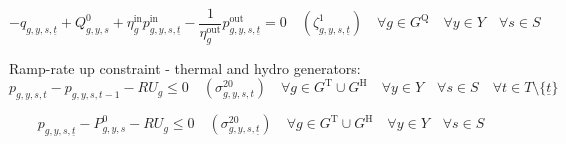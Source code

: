 \documentclass{article}
\newcommand{\sGeneratorsThermal}{G^{\mathrm{T}}}
\newcommand{\sGeneratorsHydro}{G^{\mathrm{H}}}
\newcommand{\sStorage}{G^{\mathrm{Q}}}
\newcommand{\sYears}{Y}
\newcommand{\sScenarios}{S}
\newcommand{\sIntervals}{T}
\newcommand{\iGenerator}{g}
\newcommand{\iYear}{y}
\newcommand{\iScenario}{s}
\newcommand{\iInterval}{t}
\newcommand{\iIntervalStart}{\underline{\iInterval}}
\newcommand{\cRampRateUp}[1][\iGenerator]{RU_{#1}}
\newcommand{\cStorageUnitEfficiencyCharging}{\eta_{\iGenerator}^{\mathrm{in}}}
\newcommand{\cStorageUnitEfficiencyDischarging}{\eta_{\iGenerator}^{\mathrm{out}}}
\newcommand{\cPowerInitial}[1][\iGenerator,\iYear,\iScenario]{P_{#1}^{0}}
\newcommand{\cStorageEnergyInitial}[1][\iGenerator,\iYear,\iScenario]{Q_{#1}^{0}}
\newcommand{\vPower}[1][\iGenerator,\iYear,\iScenario,\iInterval]{p_{#1}}
\newcommand{\vPowerIn}[1][\iGenerator,\iYear,\iScenario,\iInterval]{p^{\mathrm{in}}_{#1}}
\newcommand{\vPowerOut}[1][\iGenerator,\iYear,\iScenario,\iInterval]{p^{\mathrm{out}}_{#1}}
\newcommand{\vStorageUnitEnergy}[1][\iGenerator,\iYear,\iScenario,\iInterval]{q_{#1}}
\newcommand{\dRampRateUp}[1][\iGenerator,\iYear,\iScenario,\iInterval]{\sigma_{#1}^{20}}
\newcommand{\dStorageEnergyTransition}[1][\iGenerator,\iYear,\iScenario,\iInterval]{\zeta_{#1}^{1}}
\begin{document}
\begin{equation}
	- \vStorageUnitEnergy[\iGenerator,\iYear,\iScenario,\iIntervalStart] + \cStorageEnergyInitial + \cStorageUnitEfficiencyCharging \vPowerIn[\iGenerator,\iYear,\iScenario,\iIntervalStart] - \frac{1}{\cStorageUnitEfficiencyDischarging} \vPowerOut[\iGenerator,\iYear,\iScenario,\iIntervalStart] = 0 \quad (\dStorageEnergyTransition[\iGenerator,\iYear,\iScenario,\iIntervalStart]) \quad \forall \iGenerator \in \sStorage \quad \forall \iYear \in \sYears \quad \forall \iScenario \in \sScenarios
\end{equation}

Ramp-rate up constraint - thermal and hydro generators:
\begin{equation}
	\vPower - \vPower[\iGenerator,\iYear,\iScenario,\iInterval-1] - \cRampRateUp \leq 0 \quad (\dRampRateUp) \quad \forall \iGenerator \in \sGeneratorsThermal \cup \sGeneratorsHydro \quad \forall \iYear \in \sYears \quad \forall \iScenario \in \sScenarios \quad \forall \iInterval \in \sIntervals \setminus \{\iIntervalStart\}
\end{equation}

\begin{equation}
	\vPower[\iGenerator,\iYear,\iScenario,\iIntervalStart] - \cPowerInitial - \cRampRateUp \leq 0 \quad (\dRampRateUp[\iGenerator,\iYear,\iScenario,\iIntervalStart]) \quad \forall \iGenerator \in \sGeneratorsThermal \cup \sGeneratorsHydro \quad \forall \iYear \in \sYears \quad \forall \iScenario \in \sScenarios
\end{equation}
\end{document}
